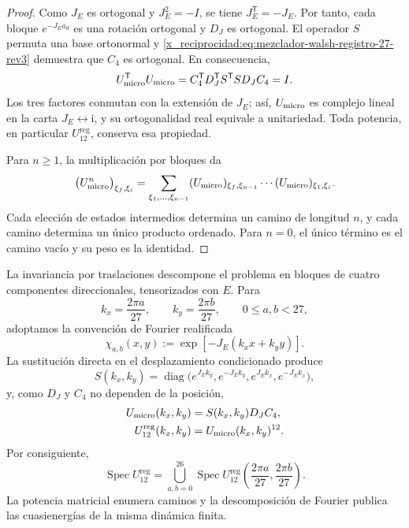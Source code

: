 \begin{proof}
Como \(J_E\) es ortogonal y \(J_E^2=-I\), se tiene
\(J_E^{\mathsf T}=-J_E\). Por tanto, cada bloque
\(e^{-J_Ea_d}\) es una rotación ortogonal y \(D_J\) es ortogonal.
El operador \(S\) permuta una base ortonormal y
\eqref{x_reciprocidad:eq:mezclador-walsh-registro-27-rev3} demuestra que \(C_4\) es
ortogonal. En consecuencia,
\[
 U_{\rm micro}^{\mathsf T}U_{\rm micro}
 =C_4^{\mathsf T}D_J^{\mathsf T}S^{\mathsf T}
   S D_JC_4
 =I.
\]
Los tres factores conmutan con la extensión de \(J_E\); así,
\(U_{\rm micro}\) es complejo lineal en la carta
\(J_E\leftrightarrow\mathrm i\), y su ortogonalidad real equivale a
unitariedad. Toda potencia, en particular
\(U_{12}^{\mathrm{reg}}\), conserva esa propiedad.

Para \(n\geq1\), la multiplicación por bloques da
\[
 \bigl(U_{\rm micro}^{n}\bigr)_{\xi_f,\xi_i}
 =
 \sum_{\xi_1,\ldots,\xi_{n-1}}
 (U_{\rm micro})_{\xi_f,\xi_{n-1}}
 \cdots
 (U_{\rm micro})_{\xi_1,\xi_i}.
\]
Cada elección de estados intermedios determina un camino de longitud \(n\),
y cada camino determina un único producto ordenado. Para \(n=0\), el único
término es el camino vacío y su peso es la identidad.
\end{proof}

La invariancia por traslaciones descompone el problema en bloques de cuatro
componentes direccionales, tensorizados con \(E\). Para
\[
 k_x=\frac{2\pi a}{27},
 \qquad
 k_y=\frac{2\pi b}{27},
 \qquad 0\leq a,b<27,
\]
adoptamos la convención de Fourier realificada
\[
 \chi_{a,b}(x,y)
 :=\exp[-J_E(k_xx+k_yy)].
\]
La sustitución directa en el desplazamiento condicionado produce
\[
 S(k_x,k_y)
 =\operatorname{diag}
 \bigl(
  e^{J_Ek_y},e^{-J_Ek_y},
  e^{J_Ek_x},e^{-J_Ek_x}
 \bigr),
\]
y, como \(D_J\) y \(C_4\) no dependen de la posición,
\begin{equation}
 \begin{aligned}
 U_{\rm micro}(k_x,k_y)
   &=S(k_x,k_y)D_JC_4,\\
 U_{12}^{\mathrm{reg}}(k_x,k_y)
   &=U_{\rm micro}(k_x,k_y)^{12}.
 \end{aligned}
 \label{x_reciprocidad:eq:bloques-fourier-registro-27-rev3}
\end{equation}
Por consiguiente,
\[
 \operatorname{Spec}U_{12}^{\mathrm{reg}}
 =
 \bigcup_{a,b=0}^{26}
 \operatorname{Spec}
 U_{12}^{\mathrm{reg}}
 \left(\frac{2\pi a}{27},\frac{2\pi b}{27}\right).
\]
La potencia matricial enumera caminos y la descomposición de Fourier publica
las cuasienergías de la misma dinámica finita.

